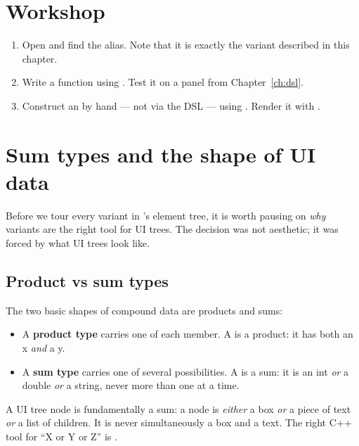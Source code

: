 \section*{Workshop}

\begin{enumerate}[leftmargin=*]
  \item Open  and find
    the  alias. Note that it is exactly the variant
    described in this chapter.
  \item Write a function
     using
    . Test it on a panel from
    Chapter~\ref{ch:dsl}.
  \item Construct an  by hand --- not via the DSL ---
    using . Render it with .
\end{enumerate}

\section{Sum types and the shape of UI data}

Before we tour every variant in \maya{}'s element tree, it is
worth pausing on \emph{why} variants are the right tool for UI
trees. The decision was not aesthetic; it was forced by what UI
trees look like.

\subsection*{Product vs sum types}

The two basic shapes of compound data are products and sums:

\begin{itemize}[leftmargin=*]
  \item A \textbf{product type} carries one of each member. A
     is a product: it has
    both an x \emph{and} a y.
  \item A \textbf{sum type} carries one of several possibilities.
    A  is a sum: it
    is an int \emph{or} a double \emph{or} a string, never more
    than one at a time.
\end{itemize}

A UI tree node is fundamentally a sum: a node is \emph{either} a
box \emph{or} a piece of text \emph{or} a list of children. It is
never simultaneously a box and a text. The right C++ tool for ``X
or Y or Z'' is .

